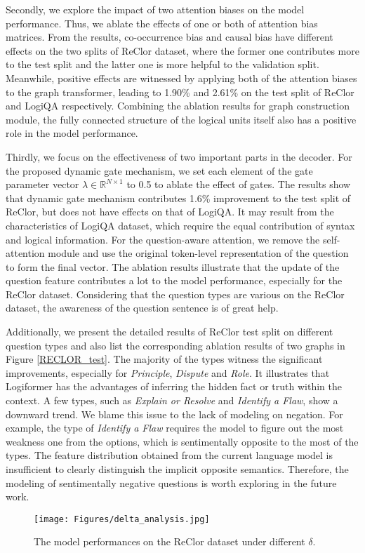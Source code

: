 \documentclass[sigconf]{acmart}
\begin{document}
Secondly, we explore the impact of two attention biases on the model 
performance. Thus, we ablate the effects of one or both of attention bias 
matrices. From the results, co-occurrence bias and causal bias have different 
effects on the two splits of ReClor dataset, where the former one contributes 
more to the test split and the latter one is more helpful to the validation 
split. Meanwhile, positive effects are witnessed by applying both of the 
attention biases to the graph transformer, leading to 1.90\% and 2.61\% on the 
test split of ReClor and LogiQA respectively. Combining the ablation results 
for graph construction module, the fully connected structure of the logical 
units itself also has a positive role in the model performance. 

Thirdly, we focus on the effectiveness of two important parts in the decoder. For the proposed dynamic gate mechanism, we set each element of the gate parameter vector $\lambda \in \mathbb{R}^{N \times 1}$ to 0.5 to ablate the effect of gates. The results show that dynamic gate mechanism contributes 1.6\% improvement to the test split of ReClor, but does not have effects on that of LogiQA. It may result from the characteristics of LogiQA dataset, which require the equal contribution of syntax and logical information. For the question-aware attention, we remove the self-attention module and use the original token-level representation of the question to form the final vector. The ablation results illustrate that the update of the question feature contributes a lot to the model performance, especially for the ReClor dataset. Considering that the question types are various on the ReClor dataset, the awareness of the question sentence is of great help.

Additionally, we present the detailed results of ReClor test split on different question types and also list the corresponding ablation results of two graphs in Figure \ref{RECLOR_test}. The majority of the types witness the significant improvements, especially for \textit{Principle}, \textit{Dispute} and \textit{Role}. It illustrates that Logiformer has the advantages of inferring the hidden fact or truth within the context. A few types, such as \textit{Explain or Resolve} and \textit{Identify a Flaw}, show a downward trend. We blame this issue to the lack of modeling on negation. For example, the type of \textit{Identify a Flaw} requires the model to figure out the most weakness one from the options, which is sentimentally opposite to the most of the types. The feature distribution obtained from the current language model is insufficient to clearly distinguish the implicit opposite semantics. Therefore, the modeling of sentimentally negative questions is worth exploring in the future work.
\begin{figure}[t]
	\large
	\centering
	\texttt{[image: Figures/delta\_analysis.jpg]}
	\vspace{-0.2cm}
	\caption{The model performances on the ReClor dataset under different $\delta$.}
	\label{delta}
	\vspace{-0.5cm}
\end{figure}
\end{document}
